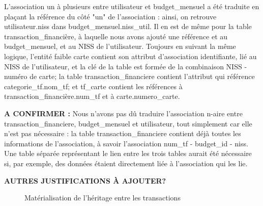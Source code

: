 \documentclass[a4paper,12pt]{article}
\begin{document}
L'association un à plusieurs entre utilisateur et budget\_mensuel a été traduite en plaçant la référence du côté "un" de l'association : ainsi, on retrouve utilisateur.niss dans budget\_mensuel.niss\_util.
Il en est de même pour la table transaction\_financière, à laquelle nous avons ajouté une référence et au budget\_mensuel, et au NISS de l'utilisateur.
Toujours en suivant la même logique, l'entité faible carte contient son attribut d'association identifiante, lié au NISS de l'utilisateur, et la clé de la table est formée de la combinaison NISS - numéro de carte; la table transaction\_financiere contient l'attribut qui référence categorie\_tf.nom\_tf; et tf\_carte contient les références à transaction\_financière.num\_tf et à carte.numero\_carte. 

\textbf{A CONFIRMER : } Nous n'avons pas dû traduire l'association n-aire entre transaction\_financiere, budget\_mensuel et utilisateur, tout simplement car elle n'est pas nécessaire : la table transaction\_financiere contient déjà toutes les informations de l'association, à savoir l'association num\_tf - budget\_id - niss. Une table séparée représentant le lien entre les trois tables aurait été nécessaire si, par exemple, des données étaient directement liée à l'association qui les lie.

\textbf{AUTRES JUSTIFICATIONS À AJOUTER?}

\begin{figure}[!ht]
\noindent
{}
\caption{\footnotesize{Matérialisation de l'héritage entre les transactions}}
\label{materialisation}
\end{figure}
\end{document}

